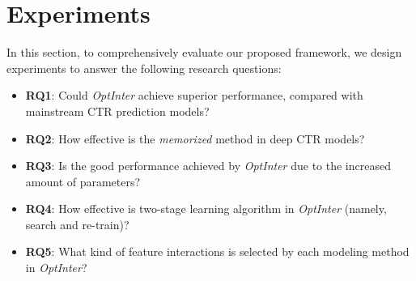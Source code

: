 \documentclass[conference]{IEEEtran}
\begin{document}
 \section{Experiments}

In this section, to comprehensively evaluate our proposed framework, we design experiments to answer the following research questions: 

\begin{itemize}
    \item \textbf{RQ1}: Could \textit{OptInter} achieve superior performance, compared with mainstream CTR prediction models?
    \item \textbf{RQ2}: How effective is the \emph{memorized} method in deep CTR models?
    \item \textbf{RQ3}: Is the good performance achieved by \textit{OptInter} due to the increased amount of parameters?
    \item \textbf{RQ4}: How effective is two-stage learning algorithm in \textit{OptInter} (namely, search and re-train)?
    \item \textbf{RQ5}: What kind of feature interactions is selected by each modeling method in \textit{OptInter}?
\end{itemize}
\end{document}
